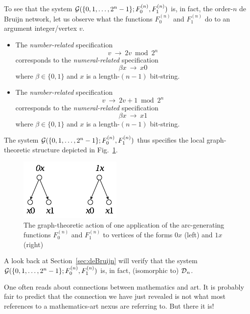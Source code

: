 To see that the system $\mbox{$\cal G$}(\{0, 1, \ldots, 2^n-1\}; F^{(n)}_0, F^{(n)}_1)$ is, in fact, the order-$n$
de Bruijn network, let us observe what the functions $F^{(n)}_0$ and $F^{(n)}_1$ do to an
argument integer/vertex $v$.
\begin{itemize}
\item
The {\em number-related} specification
\[ v \ \longrightarrow \ 2v \bmod 2^n \]
corresponds to the {\em numeral-related} specification
\[ \beta x \ \longrightarrow \ x0 \]
where $\beta \in \{0,1\}$ and $x$ is a length-$(n-1)$ bit-string.

\item
The {\em number-related} specification
\[ v \ \longrightarrow \ 2v+1  \bmod 2^n \]
corresponds to the {\em numeral-related} specification
\[ \beta x \ \longrightarrow \ x1 \]
where $\beta \in \{0,1\}$ and $x$ is a length-$(n-1)$ bit-string.
\end{itemize}
The system $\mbox{$\cal G$}(\{0, 1, \ldots, 2^n-1\}; F^{(n)}_0, F^{(n)}_1)$ thus specifies the local
graph-theoretic structure depicted in Fig.~\ref{fig:one-DB-node}.
\begin{figure}[hbt]
\begin{center}
       \includegraphics[scale=0.5]{FiguresGraph/codingTree2}
\caption{The graph-theoretic action of one application of the arc-generating functions 
$F^{(n)}_0$ and  $F^{(n)}_1$ to vertices of the forms $0x$ (left) and $1x$ (right)}
\label{fig:one-DB-node}
\end{center}
\end{figure}
A look back at Section~\ref{sec:deBruijn} will verify that the system
$\mbox{$\cal G$}(\{0, 1, \ldots, 2^n-1\}; F^{(n)}_0, F^{(n)}_1)$ is, in fact, (isomorphic to) $\mbox{$\cal D$}_n$.

\vspace*{.35in}

One often reads about connections between mathematics and art.  It is probably fair to predict that the connection we have just revealed is not what most references to a mathematics-art nexus are referring to.  But there it is!


